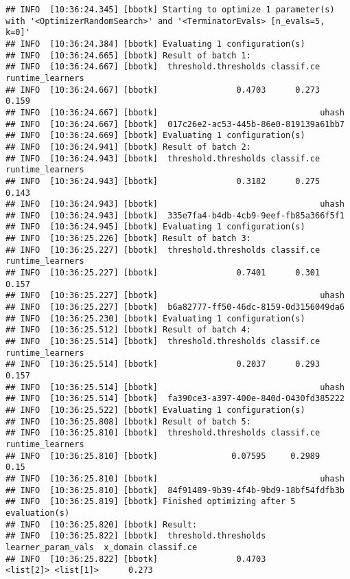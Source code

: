 \documentclass[
]{scrbook}
\begin{document}
\begin{verbatim}
## INFO  [10:36:24.345] [bbotk] Starting to optimize 1 parameter(s) with '<OptimizerRandomSearch>' and '<TerminatorEvals> [n_evals=5, k=0]' 
## INFO  [10:36:24.384] [bbotk] Evaluating 1 configuration(s) 
## INFO  [10:36:24.665] [bbotk] Result of batch 1: 
## INFO  [10:36:24.667] [bbotk]  threshold.thresholds classif.ce runtime_learners 
## INFO  [10:36:24.667] [bbotk]                0.4703      0.273            0.159 
## INFO  [10:36:24.667] [bbotk]                                 uhash 
## INFO  [10:36:24.667] [bbotk]  017c26e2-ac53-445b-86e0-819139a61bb7 
## INFO  [10:36:24.669] [bbotk] Evaluating 1 configuration(s) 
## INFO  [10:36:24.941] [bbotk] Result of batch 2: 
## INFO  [10:36:24.943] [bbotk]  threshold.thresholds classif.ce runtime_learners 
## INFO  [10:36:24.943] [bbotk]                0.3182      0.275            0.143 
## INFO  [10:36:24.943] [bbotk]                                 uhash 
## INFO  [10:36:24.943] [bbotk]  335e7fa4-b4db-4cb9-9eef-fb85a366f5f1 
## INFO  [10:36:24.945] [bbotk] Evaluating 1 configuration(s) 
## INFO  [10:36:25.226] [bbotk] Result of batch 3: 
## INFO  [10:36:25.227] [bbotk]  threshold.thresholds classif.ce runtime_learners 
## INFO  [10:36:25.227] [bbotk]                0.7401      0.301            0.157 
## INFO  [10:36:25.227] [bbotk]                                 uhash 
## INFO  [10:36:25.227] [bbotk]  b6a82777-ff50-46dc-8159-0d3156049da6 
## INFO  [10:36:25.230] [bbotk] Evaluating 1 configuration(s) 
## INFO  [10:36:25.512] [bbotk] Result of batch 4: 
## INFO  [10:36:25.514] [bbotk]  threshold.thresholds classif.ce runtime_learners 
## INFO  [10:36:25.514] [bbotk]                0.2037      0.293            0.157 
## INFO  [10:36:25.514] [bbotk]                                 uhash 
## INFO  [10:36:25.514] [bbotk]  fa390ce3-a397-400e-840d-0430fd385222 
## INFO  [10:36:25.522] [bbotk] Evaluating 1 configuration(s) 
## INFO  [10:36:25.808] [bbotk] Result of batch 5: 
## INFO  [10:36:25.810] [bbotk]  threshold.thresholds classif.ce runtime_learners 
## INFO  [10:36:25.810] [bbotk]               0.07595     0.2989             0.15 
## INFO  [10:36:25.810] [bbotk]                                 uhash 
## INFO  [10:36:25.810] [bbotk]  84f91489-9b39-4f4b-9bd9-18bf54fdfb3b 
## INFO  [10:36:25.819] [bbotk] Finished optimizing after 5 evaluation(s) 
## INFO  [10:36:25.820] [bbotk] Result: 
## INFO  [10:36:25.822] [bbotk]  threshold.thresholds learner_param_vals  x_domain classif.ce 
## INFO  [10:36:25.822] [bbotk]                0.4703          <list[2]> <list[1]>      0.273
\end{verbatim}
\end{document}
